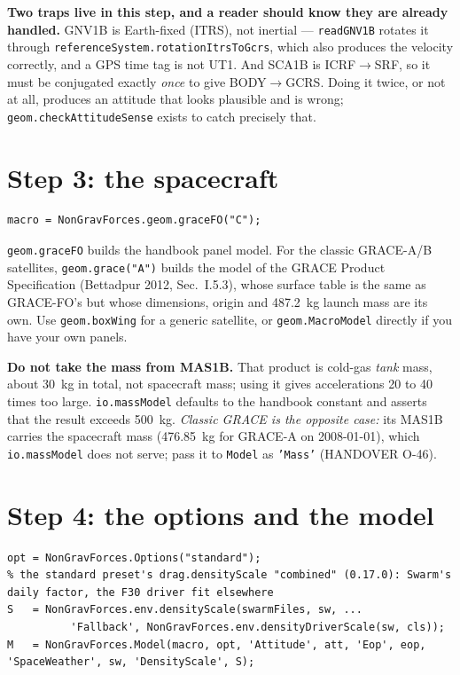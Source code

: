 \documentclass[11pt,a4paper]{report}
\begin{document}
\noindent \textbf{Two traps live in this step, and a reader should know they are already handled.}
GNV1B is Earth-fixed (ITRS), not inertial --- \texttt{readGNV1B} rotates it through
\texttt{referenceSystem.rotationItrsToGcrs}, which also produces the velocity correctly, and a GPS
time tag is not UT1. And SCA1B is ICRF$\to$SRF, so it must be conjugated exactly \emph{once} to give
BODY$\to$GCRS. Doing it twice, or not at all, produces an attitude that looks plausible and is
wrong; \texttt{geom.checkAttitudeSense} exists to catch precisely that.

\section{Step 3: the spacecraft}
\begin{lstlisting}
macro = NonGravForces.geom.graceFO("C");
\end{lstlisting}

\noindent \texttt{geom.graceFO} builds the handbook panel model. For the classic GRACE-A/B satellites,
\texttt{geom.grace("A")} builds the model of the GRACE Product Specification (Bettadpur 2012,
Sec.~I.5.3), whose surface table is the same as GRACE-FO's but whose dimensions, origin and
\SI{487.2}{\kilo\gram} launch mass are its own. Use \texttt{geom.boxWing} for a
generic satellite, or \texttt{geom.MacroModel} directly if you have your own panels.

\textbf{Do not take the mass from MAS1B.} That product is cold-gas \emph{tank} mass, about
\SI{30}{\kilo\gram} in total, not spacecraft mass; using it gives accelerations 20 to 40 times too
large. \texttt{io.massModel} defaults to the handbook constant and asserts that the result exceeds
\SI{500}{\kilo\gram}. \emph{Classic GRACE is the opposite case:} its MAS1B carries the spacecraft
mass (\SI{476.85}{\kilo\gram} for GRACE-A on 2008-01-01), which \texttt{io.massModel} does not serve;
pass it to \texttt{Model} as \texttt{'Mass'} (HANDOVER O-46).

\section{Step 4: the options and the model}
\begin{lstlisting}
opt = NonGravForces.Options("standard");
% the standard preset's drag.densityScale "combined" (0.17.0): Swarm's daily factor, the F30 driver fit elsewhere
S   = NonGravForces.env.densityScale(swarmFiles, sw, ...
          'Fallback', NonGravForces.env.densityDriverScale(sw, cls));
M   = NonGravForces.Model(macro, opt, 'Attitude', att, 'Eop', eop, 'SpaceWeather', sw, 'DensityScale', S);
\end{lstlisting}
\end{document}
